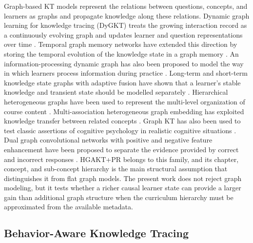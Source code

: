 \documentclass[11pt]{article}
\begin{document}
Graph-based KT models represent the relations between questions, concepts, and learners as graphs and propagate knowledge along these relations. Dynamic graph learning for knowledge tracing (DyGKT) treats the growing interaction record as a continuously evolving graph and updates learner and question representations over time \cite{cheng2024dygkt}. Temporal graph memory networks have extended this direction by storing the temporal evolution of the knowledge state in a graph memory \cite{gad2026temporal}. An information-processing dynamic graph has also been proposed to model the way in which learners process information during practice \cite{xiao2026information}. Long-term and short-term knowledge state graphs with adaptive fusion have shown that a learner's stable knowledge and transient state should be modelled separately \cite{yu2025exploring}. Hierarchical heterogeneous graphs have been used to represent the multi-level organization of course content \cite{li2026hierarchical}. Multi-association heterogeneous graph embedding has exploited knowledge transfer between related concepts \cite{yang2025mahkt}. Graph KT has also been used to test classic assertions of cognitive psychology in realistic cognitive situations \cite{wu2025graph}. Dual graph convolutional networks with positive and negative feature enhancement have been proposed to separate the evidence provided by correct and incorrect responses \cite{wang2025dual}. HGAKT+PR belongs to this family, and its chapter, concept, and sub-concept hierarchy is the main structural assumption that distinguishes it from flat graph models. The present work does not reject graph modeling, but it tests whether a richer causal learner state can provide a larger gain than additional graph structure when the curriculum hierarchy must be approximated from the available metadata.

\subsection{Behavior-Aware Knowledge Tracing}
\end{document}
